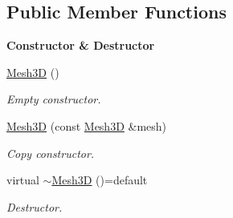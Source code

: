 \subsection*{Public Member Functions}
\begin{Indent}{\bf Constructor \& Destructor}\par
\begin{DoxyCompactItemize}
\item 
\hyperlink{classFVCode3D_1_1Mesh3D_a761b316925bc26ca886e126e9a397bd5}{Mesh3D} ()
\begin{DoxyCompactList}\small\item\em Empty constructor. \end{DoxyCompactList}\item 
\hyperlink{classFVCode3D_1_1Mesh3D_a1d214ce5c2472a00e102176ff4e08eba}{Mesh3D} (const \hyperlink{classFVCode3D_1_1Mesh3D}{Mesh3D} \&mesh)
\begin{DoxyCompactList}\small\item\em Copy constructor. \end{DoxyCompactList}\item 
virtual \hyperlink{classFVCode3D_1_1Mesh3D_a8722d39e0907d0f0e9e04bc6ef803836}{$\sim$\+Mesh3D} ()=default
\begin{DoxyCompactList}\small\item\em Destructor. \end{DoxyCompactList}\end{DoxyCompactItemize}
\end{Indent}
